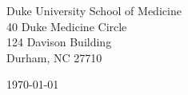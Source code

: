 \begin{minipage}{0.49\textwidth}
    \begin{flushleft}
    \noindent
    Duke University School of Medicine\\
    40 Duke Medicine Circle\\
    124 Davison Building\\
    Durham, NC 27710
    \end{flushleft}
    \end{minipage}
    \begin{minipage}{0.47\textwidth}
    \begin{flushright}
    \today
    \end{flushright}
    \end{minipage} \\
    
    \newcommand{\univ}{Duke University}
    \newcommand{\univshort}{Duke}
    \newcommand{\degree}{Ph.D.}
    \newcommand{\dept}{Computational Biology and Bioinformatics}